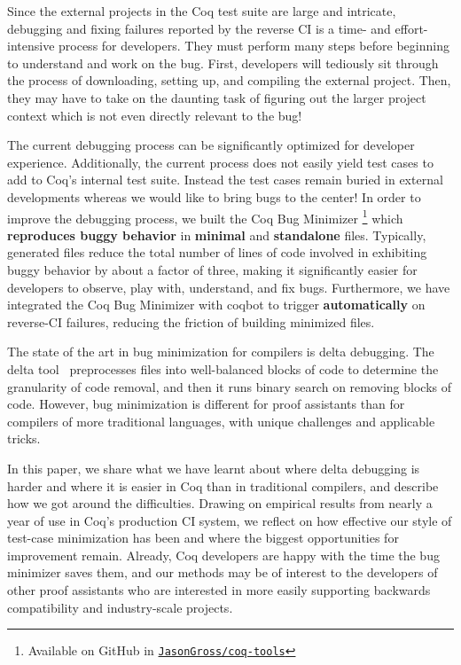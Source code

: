 \documentclass[a4paper,USenglish,cleveref,autoref,thm-restate]{lipics-v2021}
\begin{document}
Since the external projects in the Coq test suite are large and intricate, debugging and fixing failures reported by the reverse CI is a time- and effort-intensive process for developers.
They must perform many steps before beginning to understand and work on the bug.
First, developers will tediously sit through the process of downloading, setting up, and compiling the external project.
Then, they may have to take on the daunting task of figuring out the larger project context which is not even directly relevant to the bug!

The current debugging process can be significantly optimized for developer experience.
Additionally, the current process does not easily yield test cases to add to Coq's internal test suite.
Instead the test cases remain buried in external developments whereas we would like to bring bugs to the center!
In order to improve the debugging process, we built the Coq Bug Minimizer%
\footnote{%
Available on GitHub in \href{https://github.com/JasonGross/coq-tools}{\texttt{JasonGross/coq-tools}}%
}
which \textbf{reproduces buggy behavior} in \textbf{minimal} and \textbf{standalone} files.
Typically, generated files reduce the total number of lines of code involved in exhibiting buggy behavior by about a factor of three, making it significantly easier for developers to observe, play with, understand, and fix bugs.
Furthermore, we have integrated the Coq Bug Minimizer with coqbot to trigger \textbf{automatically} on reverse-CI failures, reducing the friction of building minimized files.

The state of the art in bug minimization for compilers is delta debugging.
The delta tool~\cite{delta} preprocesses files into well-balanced blocks of code to determine the granularity of code removal, and then it runs binary search on removing blocks of code.
However, bug minimization is different for proof assistants than for compilers of more traditional languages, with unique challenges and applicable tricks.

In this paper, we share what we have learnt about where delta debugging is harder and where it is easier in Coq than in traditional compilers, and describe how we got around the difficulties.
Drawing on empirical results from nearly a year of use in Coq's production CI system, we reflect on how effective our style of test-case minimization has been and where the biggest opportunities for improvement remain.
Already, Coq developers are happy with the time the bug minimizer saves them, and our methods may be of interest to the developers of other proof assistants who are interested in more easily supporting backwards compatibility and industry-scale projects.
\end{document}
